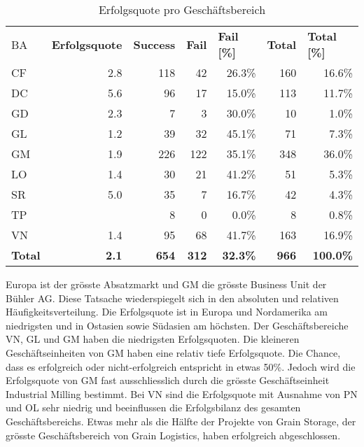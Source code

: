 \begin{table}[htbp]
	\centering
	\caption{Erfolgsquote pro Geschäftsbereich}
	\begin{tabular}{lrrrrrr}
		BA    & \multicolumn{1}{l}{\textbf{Erfolgsquote}} & \multicolumn{1}{l}{\textbf{Success}} & \multicolumn{1}{l}{\textbf{Fail}} & \multicolumn{1}{l}{\textbf{Fail [\%]}} & \multicolumn{1}{l}{\textbf{Total}} & \multicolumn{1}{l}{\textbf{Total [\%]}} \\
		CF    & 2.8   & 118   & 42    & 26.3\% & 160   & 16.6\% \\
		DC    & 5.6   & 96    & 17    & 15.0\% & 113   & 11.7\% \\
		GD    & 2.3   & 7     & 3     & 30.0\% & 10    & 1.0\% \\
		GL    & 1.2   & 39    & 32    & 45.1\% & 71    & 7.3\% \\
		GM    & 1.9   & 226   & 122   & 35.1\% & 348   & 36.0\% \\
		LO    & 1.4   & 30    & 21    & 41.2\% & 51    & 5.3\% \\
		SR    & 5.0   & 35    & 7     & 16.7\% & 42    & 4.3\% \\
		TP    &       & 8     & 0     & 0.0\% & 8     & 0.8\% \\
		VN    & 1.4   & 95    & 68    & 41.7\% & 163   & 16.9\% \\
		\textbf{Total } & \textbf{2.1} & \textbf{654} & \textbf{312} & \textbf{32.3\%} & \textbf{966} & \textbf{100.0\%} \\
	\end{tabular}%
	\label{tab:addlabel}%
\end{table}%
\newline Europa ist der grösste Absatzmarkt und GM die grösste Business Unit  der Bühler AG. Diese Tatsache wiederspiegelt sich in den absoluten und relativen Häufigkeitsverteilung. Die Erfolgsquote ist in Europa und Nordamerika am niedrigsten und in Ostasien sowie Südasien am höchsten. Der Geschäftsbereiche VN, GL und GM haben die niedrigsten Erfolgsquoten.
\newpage
Die kleineren Geschäftseinheiten von GM haben eine relativ tiefe Erfolgsquote. Die Chance, dass es erfolgreich oder nicht-erfolgreich entspricht in etwas 50\%. Jedoch wird die Erfolgsquote von GM fast ausschliesslich durch die grösste Geschäftseinheit Industrial Milling bestimmt. Bei VN sind die Erfolgsquote mit Ausnahme von PN und OL sehr niedrig und beeinflussen die Erfolgsbilanz des gesamten Geschäftsbereichs. Etwas mehr als die Hälfte der Projekte von Grain Storage, der grösste Geschäftsbereich von Grain Logistics, haben erfolgreich abgeschlossen. 
